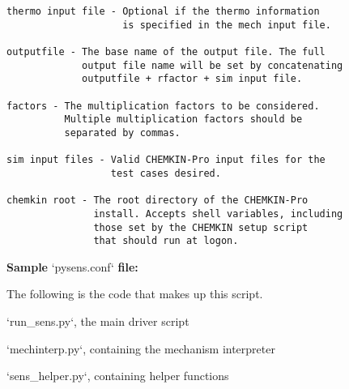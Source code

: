\begin{singlespace}
{\begin{Verbatim}
thermo input file - Optional if the thermo information
                    is specified in the mech input file.

outputfile - The base name of the output file. The full
             output file name will be set by concatenating
             outputfile + rfactor + sim input file.

factors - The multiplication factors to be considered.
          Multiple multiplication factors should be
          separated by commas.

sim input files - Valid CHEMKIN-Pro input files for the
                  test cases desired.

chemkin root - The root directory of the CHEMKIN-Pro
               install. Accepts shell variables, including
               those set by the CHEMKIN setup script
               that should run at logon.
\end{Verbatim}

{\large \textbf{Sample} `pysens.conf` \textbf{file:}}

The following is the code that makes up this script.

\cleardoublepage

{\Large `run\_sens.py`, the main driver script}


\cleardoublepage

{\Large `mechinterp.py`, containing the mechanism interpreter}


\cleardoublepage

{\Large `sens\_helper.py`, containing helper functions}

}
\end{singlespace}
